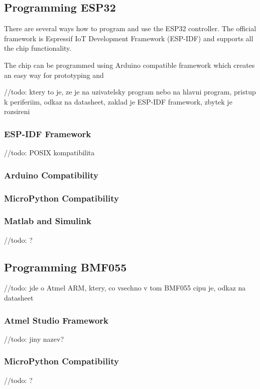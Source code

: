 \subsection{Programming ESP32}
There are several ways how to program and use the ESP32 \cite{espressif:ESP-WROOM-32} controller. The official framework is Espressif IoT Development Framework (ESP-IDF) \cite{ESP-IDF} and supports all the chip functionality.

The chip can be programmed using Arduino compatible framework which creates an easy way for prototyping and 

//todo: ktery to je, ze je na uzivatelsky program nebo na hlavni program, pristup k periferiim, odkaz na datasheet, zaklad je ESP-IDF framework, zbytek je rozsireni

\subsubsection{ESP-IDF Framework}
//todo: POSIX kompatibilita

\subsubsection{Arduino Compatibility}

\subsubsection{MicroPython Compatibility}

\subsubsection{Matlab and Simulink}
//todo: ?

\subsection{Programming BMF055}
//todo: jde o Atmel ARM, ktery, co vsechno v tom BMF055 cipu je, odkaz na datasheet

\subsubsection{Atmel Studio Framework}
//todo: jiny nazev?

\subsubsection{MicroPython Compatibility}
//todo: ?

